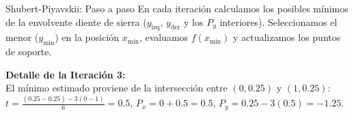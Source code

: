\begin{frame}{Shubert-Piyavskii: Paso a paso}
\small
En cada iteración calculamos los posibles mínimos de la envolvente diente de sierra (\(y_{\text{izq}}\), \(y_{\text{der}}\) y los \(P_y\) interiores). Seleccionamos el menor (\(y_{\min}\)) en la posición \(x_{\min}\), evaluamos \(f(x_{\min})\) y actualizamos los puntos de soporte.

\vspace{0.25cm}
\centering
\renewcommand{\arraystretch}{1.25}

\vspace{0.25cm}
\raggedright
\footnotesize
\textbf{Detalle de la Iteración 3:} \\
El mínimo estimado proviene de la intersección entre \((0, 0.25)\) y \((1, 0.25)\): \\
\(t = \frac{(0.25 - 0.25) - 3(0 - 1)}{6} = 0.5\),  \(P_x = 0 + 0.5 = \mathbf{0.5}\), \(P_y = 0.25 - 3(0.5) = \mathbf{-1.25}\).
\end{frame}

